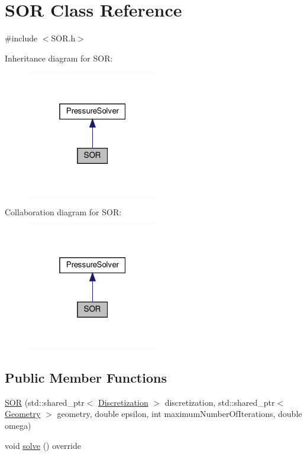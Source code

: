 \hypertarget{classSOR}{}\section{S\+OR Class Reference}
\label{classSOR}


{\ttfamily \#include $<$S\+O\+R.\+h$>$}



Inheritance diagram for S\+OR\+:
\nopagebreak
\begin{figure}[H]
\begin{center}
\leavevmode
\includegraphics[width=163pt]{classSOR__inherit__graph}
\end{center}
\end{figure}


Collaboration diagram for S\+OR\+:
\nopagebreak
\begin{figure}[H]
\begin{center}
\leavevmode
\includegraphics[width=163pt]{classSOR__coll__graph}
\end{center}
\end{figure}
\subsection*{Public Member Functions}
\begin{DoxyCompactItemize}
\item 
\mbox{\hyperlink{classSOR_a2d9d05fd4db988cb3b69c0e7a8cf3950}{S\+OR}} (std\+::shared\+\_\+ptr$<$ \mbox{\hyperlink{classDiscretization}{Discretization}} $>$ discretization, std\+::shared\+\_\+ptr$<$ \mbox{\hyperlink{classGeometry}{Geometry}} $>$ geometry, double epsilon, int maximum\+Number\+Of\+Iterations, double omega)
\item 
void \mbox{\hyperlink{classSOR_a860992d85d8aacf114a3a02b5831f728}{solve}} () override
\end{DoxyCompactItemize}
